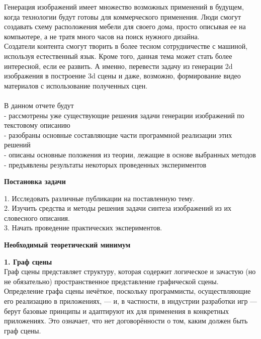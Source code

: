 \documentclass{article}
\begin{document}
    Генерация изображений имеет множество возможных применений в
    будущем, когда технологии будут готовы для коммерческого применения. 
    Люди смогут создавать схему расположения мебели для своего дома, просто описывая ее на компьютере, а не тратя много часов на поиск нужного дизайна.\\ 
    Создатели контента смогут творить в более тесном сотрудничестве с машиной, используя естественный язык.
    Кроме того, данная тема может стать более интересной, если ее развить. А именно, перевести задачу из генерации 2d изображения в построение 3d сцены и даже, возможно, формирование видео материалов с использование полученных сцен.\\ \\
    В данном отчете будут \\
    - рассмотрены уже существующие решения задачи генерации изображений по текстовому описанию\\
    - разобраны основные составляющие части программной реализации этих решений\\
    - описаны основные положения из теории, лежащие в основе выбранных методов\\
    - предъявлены результаты некоторых проведенных экспериментов\\
    \newpage
    \begin{center} 
    \huge \textbf{Постановка задачи} \\[1.3cm]
    \end{center} 
      \large 1. Исследовать различные публикации на поставленную тему.\\
             2. Изучить средства и методы решения задачи синтеза изображений из их словесного описания.\\
             3. Начать проведение практических экспериментов.\\
    \newpage
    \begin{center} 
    \huge \textbf{Необходимый теоретический минимум} \\[1.3cm]
    \end{center} 
      \large \textbf{1. Граф сцены}\\
      Граф сцены представляет структуру, которая содержит логическое и зачастую (но не обязательно) пространственное представление графической сцены. Определение графа сцены нечёткое, поскольку программисты, осуществляющие его реализацию в приложениях, — и, в частности, в индустрии разработки игр — берут базовые принципы и адаптируют их для применения в конкретных приложениях. Это означает, что нет договорённости о том, каким должен быть граф сцены.
\end{document}
